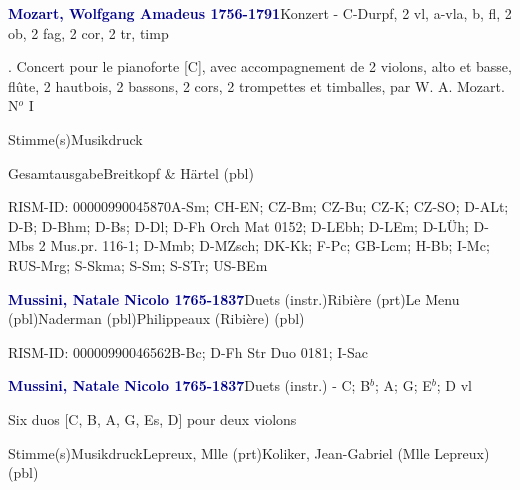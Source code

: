 \documentclass[twocolumn]{book}
\begin{document}
\par \vspace{7pt} \textcolor{darkblue}{\textbf{Mozart, Wolfgang Amadeus  1756-1791}}\hfillplus{\textbf{[304]}}\newline Konzert - C-Dur\newline pf, 2 vl, a-vla, b, fl, 2 ob, 2 fag, 2 cor, 2 tr, timp
\par \begin{itshape}. Concert pour le pianoforte [C], avec accompagnement de 2 violons, alto et basse, flûte, 2 hautbois, 2 bassons, 2 cors, 2 trompettes et timballes, par W. A. Mozart. N$^o$ I\end{itshape} 
\par \textcolor{darkblue}{}  Stimme(s)\newline Musikdruck
\par Gesamtausgabe\newline Breitkopf \& Härtel  (pbl)
\par RISM-ID: 00000990045870\newline A-Sm; CH-EN; CZ-Bm; CZ-Bu; CZ-K; CZ-SO; D-ALt; D-B; D-Bhm; D-Bs; D-Dl; D-Fh  Orch Mat 0152; D-LEbh; D-LEm; D-LÜh; D-Mbs  2 Mus.pr. 116-1; D-Mmb; D-MZsch; DK-Kk; F-Pc; GB-Lcm; H-Bb; I-Mc; RUS-Mrg; S-Skma; S-Sm; S-STr; US-BEm
\par \vspace{7pt} \textcolor{darkblue}{\textbf{Mussini, Natale Nicolo  1765-1837}}\hfillplus{\textbf{[305]}}\newline Duets (instr.)\newline Ribière  (prt)\newline Le Menu  (pbl)\newline Naderman  (pbl)\newline Philippeaux (Ribière)  (pbl)
\par RISM-ID: 00000990046562\newline B-Bc; D-Fh  Str Duo 0181; I-Sac
\par \vspace{7pt} \textcolor{darkblue}{\textbf{Mussini, Natale Nicolo  1765-1837}}\hfillplus{\textbf{[306]}}\newline Duets (instr.) - C; B$^b$; A; G; E$^b$; D vl
\par \begin{itshape}Six duos [C, B, A, G, Es, D] pour deux violons\end{itshape} 
\par \textcolor{darkblue}{}  Stimme(s)\newline Musikdruck\newline Lepreux, Mlle  (prt)\newline Koliker, Jean-Gabriel (Mlle Lepreux)  (pbl)
\end{document}

